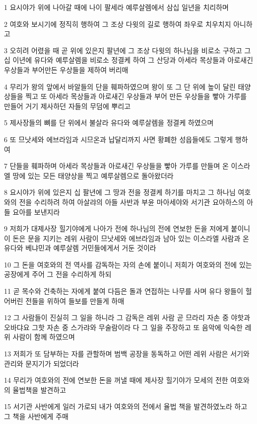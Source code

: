 \par 1 요시야가 위에 나아갈 때에 나이 팔세라 예루살렘에서 삼십 일년을 치리하며
\par 2 여호와 보시기에 정직히 행하여 그 조상 다윗의 길로 행하여 좌우로 치우치지 아니하고
\par 3 오히려 어렸을 때 곧 위에 있은지 팔년에 그 조상 다윗의 하나님을 비로소 구하고 그 십 이년에 유다와 예루살렘을 비로소 정결케 하여 그 산당과 아세라 목상들과 아로새긴 우상들과 부어만든 우상들을 제하여 버리매
\par 4 무리가 왕의 앞에서 바알들의 단을 훼파하였으며 왕이 또 그 단 위에 높이 달린 태양상들을 찍고 또 아세라 목상들과 아로새긴 우상들과 부어 만든 우상들을 빻아 가루를 만들어 거기 제사하던 자들의 무덤에 뿌리고
\par 5 제사장들의 뼈를 단 위에서 불살라 유다와 예루살렘을 정결케 하였으며
\par 6 또 므낫세와 에브라임과 시므온과 납달리까지 사면 황폐한 성읍들에도 그렇게 행하여
\par 7 단들을 훼파하며 아세라 목상들과 아로새긴 우상들을 빻아 가루를 만들며 온 이스라엘 땅에 있는 모든 태양상을 찍고 예루살렘으로 돌아왔더라
\par 8 요시야가 위에 있은지 십 팔년에 그 땅과 전을 정결케 하기를 마치고 그 하나님 여호와의 전을 수리하려 하여 아살랴의 아들 사반과 부윤 마아세야와 서기관 요아하스의 아들 요아를 보낸지라
\par 9 저희가 대제사장 힐기야에게 나아가 전에 하나님의 전에 연보한 돈을 저에게 붙이니 이 돈은 문을 지키는 레위 사람이 므낫세와 에브라임과 남아 있는 이스라엘 사람과 온 유다와 베냐민과 예루살렘 거민들에게서 거둔 것이라
\par 10 그 돈을 여호와의 전 역사를 감독하는 자의 손에 붙이니 저희가 여호와의 전에 있는 공장에게 주어 그 전을 수리하게 하되
\par 11 곧 목수와 건축하는 자에게 붙여 다듬은 돌과 연접하는 나무를 사며 유다 왕들이 헐어버린 전들을 위하여 들보를 만들게 하매
\par 12 그 사람들이 진실히 그 일을 하니라 그 감독은 레위 사람 곧 므라리 자손 중 야핫과 오바댜요 그핫 자손 중 스가랴와 무술람이라 다 그 일을 주장하고 또 음악에 익숙한 레위 사람이 함께 하였으며
\par 13 저희가 또 담부하는 자를 관할하며 범백 공장을 동독하고 어떤 레위 사람은 서기와 관리와 문지기가 되었더라
\par 14 무리가 여호와의 전에 연보한 돈을 꺼낼 때에 제사장 힐기야가 모세의 전한 여호와의 율법책을 발견하고
\par 15 서기관 사반에게 일러 가로되 내가 여호와의 전에서 율법 책을 발견하였노라 하고 그 책을 사반에게 주매
